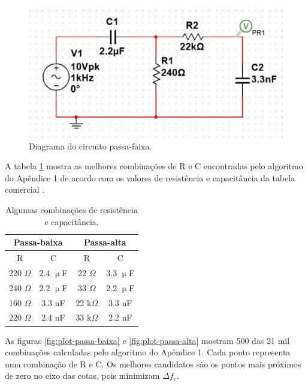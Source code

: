 \documentclass{article}
\begin{document}
\begin{figure}[ht!]
  \centering
  \includegraphics[width=.7\textwidth]{fig/circ-faixa.png}
  \caption{Diagrama do circuito passa-faixa.}
  \label{fig:circ-faixa}
\end{figure}

\pagebreak

A tabela \ref{tab:comb} mostra as melhores combinações de R e C encontradas pelo algoritmo do Apêndice 1 de acordo com os valores de resistência e capacitância da tabela comercial \cite{tabela-comercial}.

\begin{table}[!htbp]
  \centering
  \begin{tabular}{|c|c|c|c|}
    \hline
    \multicolumn{2}{|c|}{Passa-baixa} & \multicolumn{2}{c|}{Passa-alta}                               \\
    \hline
    R                                 & C                               & R            & C            \\
    \hline
    220 $\Omega$                      & 2.4 $\upmu$F                    & 22 $\Omega$  & 3.3 $\upmu$F \\
    240 $\Omega$                      & 2.2 $\upmu$F                    & 33 $\Omega$  & 2.2 $\upmu$F \\
    160 $\Omega$                      & 3.3 nF                          & 22 k$\Omega$ & 3.3 nF       \\
    220 $\Omega$                      & 2.4 nF                          & 33 k$\Omega$ & 2.2 nF       \\
    \hline
  \end{tabular}
  \caption{Algumas combinações de resistência e capacitância.}
  \label{tab:comb}
\end{table}

As figuras \ref{fig:plot-passa-baixa} e \ref{fig:plot-passa-alta} mostram 500 das 21 mil combinações calculadas pelo algoritmo do Apêndice 1. Cada ponto representa uma combinação de R e C. Os melhores candidatos são os pontos mais próximos de zero no eixo das cotas, pois minimizam $\Delta f_c$.
\end{document}
